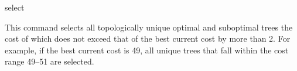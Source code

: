 \begin{command}{select}{}
\begin{poyexamples}
{This command selects all topologically unique optimal and suboptimal trees
the cost of which does not exceed that of the best current cost by more than
2. For example, if the best current cost is 49, all unique trees that fall within
the cost range 49--51 are selected.}

\end{poyexamples}

\begin{poyalso}
\end{poyalso}

\end{command}


